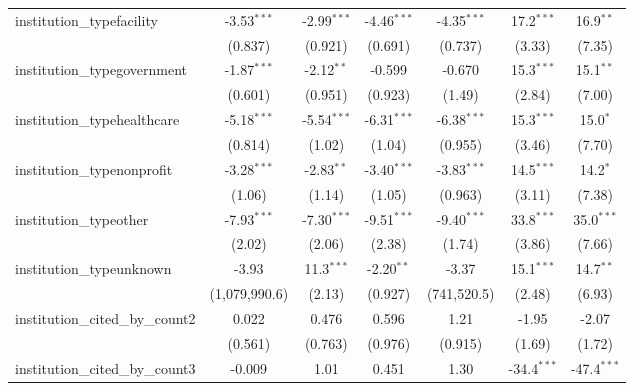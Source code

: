 \begin{tabular}{lcccccc}
   institution\_typefacility             & -3.53$^{***}$ & -2.99$^{***}$ & -4.46$^{***}$ & -4.35$^{***}$ & 17.2$^{***}$  & 16.9$^{**}$\\   
                                         & (0.837)       & (0.921)       & (0.691)       & (0.737)       & (3.33)        & (7.35)\\   
   institution\_typegovernment           & -1.87$^{***}$ & -2.12$^{**}$  & -0.599        & -0.670        & 15.3$^{***}$  & 15.1$^{**}$\\   
                                         & (0.601)       & (0.951)       & (0.923)       & (1.49)        & (2.84)        & (7.00)\\   
   institution\_typehealthcare           & -5.18$^{***}$ & -5.54$^{***}$ & -6.31$^{***}$ & -6.38$^{***}$ & 15.3$^{***}$  & 15.0$^{*}$\\   
                                         & (0.814)       & (1.02)        & (1.04)        & (0.955)       & (3.46)        & (7.70)\\   
   institution\_typenonprofit            & -3.28$^{***}$ & -2.83$^{**}$  & -3.40$^{***}$ & -3.83$^{***}$ & 14.5$^{***}$  & 14.2$^{*}$\\   
                                         & (1.06)        & (1.14)        & (1.05)        & (0.963)       & (3.11)        & (7.38)\\   
   institution\_typeother                & -7.93$^{***}$ & -7.30$^{***}$ & -9.51$^{***}$ & -9.40$^{***}$ & 33.8$^{***}$  & 35.0$^{***}$\\   
                                         & (2.02)        & (2.06)        & (2.38)        & (1.74)        & (3.86)        & (7.66)\\   
   institution\_typeunknown              & -3.93         & 11.3$^{***}$  & -2.20$^{**}$  & -3.37         & 15.1$^{***}$  & 14.7$^{**}$\\   
                                         & (1,079,990.6) & (2.13)        & (0.927)       & (741,520.5)   & (2.48)        & (6.93)\\   
   institution\_cited\_by\_count2        & 0.022         & 0.476         & 0.596         & 1.21          & -1.95         & -2.07\\   
                                         & (0.561)       & (0.763)       & (0.976)       & (0.915)       & (1.69)        & (1.72)\\   
   institution\_cited\_by\_count3        & -0.009        & 1.01          & 0.451         & 1.30          & -34.4$^{***}$ & -47.4$^{***}$\\   

\end{tabular}

